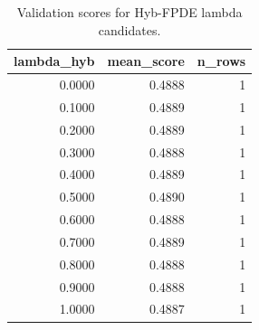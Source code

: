 \begin{table}[t]
\caption{Validation scores for Hyb-FPDE lambda candidates.}
\label{tab:lambda_distribution_computed}
\centering
\begin{tabular}{rrr}
\toprule
lambda\_hyb & mean\_score & n\_rows \\
\midrule
0.0000 & 0.4888 & 1 \\
0.1000 & 0.4889 & 1 \\
0.2000 & 0.4889 & 1 \\
0.3000 & 0.4888 & 1 \\
0.4000 & 0.4889 & 1 \\
0.5000 & 0.4890 & 1 \\
0.6000 & 0.4888 & 1 \\
0.7000 & 0.4889 & 1 \\
0.8000 & 0.4888 & 1 \\
0.9000 & 0.4888 & 1 \\
1.0000 & 0.4887 & 1 \\
\bottomrule
\end{tabular}

\end{table}
